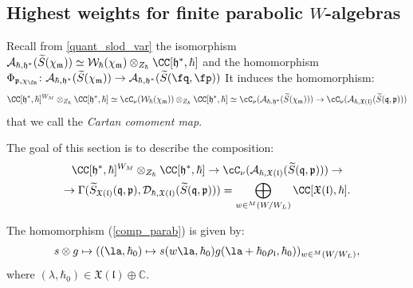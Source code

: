 \documentclass[12pt]{amsart}
\begin{document}
\subsection{Highest weights for finite parabolic $W$-algebras}
Recall from \cref{quant_slod_var} the isomorphism $\mathcal{A}_{\hbar,\mathfrak{h}^*}(\widetilde{S}(\chi_{\mathfrak{m}}))\simeq\mathcal{W}_{\hbar}(\chi_{\mathfrak{m}}) \otimes_{Z_\hbar} \CC[\mathfrak{h}^*,\hbar]$  and the homomorphism $\Phi_{\mathfrak{p}, \chi_\fm}\colon \mathcal{A}_{\hbar,\mathfrak{h}^*}(\widetilde{S}(\chi_{\mathfrak{m}}))\to \mathcal{A}_{\hbar,\mathfrak{h}^*}(\widetilde{S}(\fq, \fp))$ %
It induces the homomorphism: 
\begin{equation*}
\CC[\mathfrak{h}^*,\hbar]^{W_M} \otimes_{Z_\hbar} \CC[\mathfrak{h}^*,\hbar]\simeq\cC_\nu(\mathcal{W}_{\hbar}(\chi_{\mathfrak{m}})) \otimes_{Z_\hbar} \CC[\mathfrak{h}^*,\hbar]\simeq \cC_\nu(\mathcal{A}_{\hbar,\mathfrak{h}^*}(\widetilde{S}(\chi_{\mathfrak{m}}))) \rightarrow \cC_\nu(\mathcal{A}_{\hbar,\mathfrak{X}(\mathfrak{l})}(\widetilde{S}(\mathfrak{q},\mathfrak{p})))
\end{equation*}
that we call the \emph{Cartan comoment map}.

The goal of this section is to describe the composition: 
\begin{multline}\label{comp_parab}
\CC[\mathfrak{h}^*,\hbar]^{W_M} \otimes_{Z_\hbar} \CC[\mathfrak{h}^*,\hbar] \rightarrow \cC_\nu(\mathcal{A}_{\hbar,\mathfrak{X}(\mathfrak{l})}(\widetilde{S}(\mathfrak{q},\mathfrak{p}))) \rightarrow \\ \rightarrow \Gamma(\widetilde{S}_{\mathfrak{X}(\mathfrak{l})}(\mathfrak{q},\mathfrak{p}),\mathcal{D}_{\hbar,\mathfrak{X}(\mathfrak{l})}(\widetilde{S}(\mathfrak{q},\mathfrak{p})))=\bigoplus_{w \in {}^{M}(W/W_L)} \CC[\mathfrak{X}(\mathfrak{l}),\hbar].
\end{multline}



\begin{lemma}\label{lemma_hw_compute_parabolicW}
The homomorphism (\ref{comp_parab}) is given by:  
\begin{equation*}
s \otimes g \mapsto ((\la,\hbar_0) \mapsto s(w\la,\hbar_0) g(\la+\hbar_0\rho_{{\mathfrak{l}}},\hbar_0))_{w \in {}^M(W/W_L)},
\end{equation*}
where $(\lambda,\hbar_0) \in \mathfrak{X}(\mathfrak{l}) \oplus \mathbb{C}$.
\end{lemma}
\end{document}
